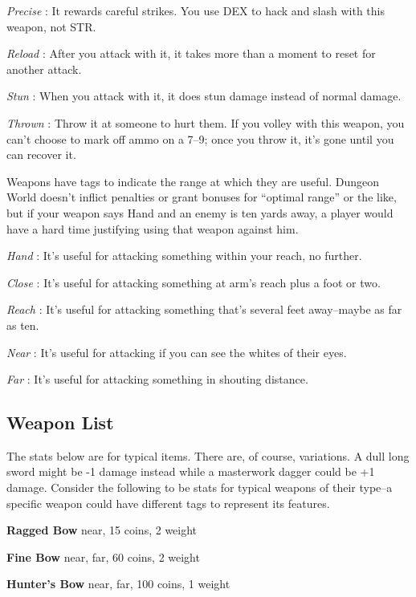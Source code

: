 \emph{Precise}
: It rewards careful strikes. You use DEX to hack and slash with this weapon, not STR.

\emph{Reload}
: After you attack with it, it takes more than a moment to reset for another attack. 

\emph{Stun}
: When you attack with it, it does stun damage instead of normal damage. 

\emph{Thrown}
: Throw it at someone to hurt them. If you volley with this weapon, you can't choose to mark off ammo on a 7--9; once you throw it, it's gone until you can recover it. 

Weapons have tags to indicate the range at which they are useful. Dungeon World doesn't inflict penalties or grant bonuses for ``optimal range'' or the like, but if your weapon says Hand and an enemy is ten yards away, a player would have a hard time justifying using that weapon against him.

\emph{Hand}
: It's useful for attacking something within your reach, no further.

\emph{Close}
: It's useful for attacking something at arm's reach plus a foot or two.

\emph{Reach}
: It's useful for attacking something that's several feet away--maybe as far as ten. 

\emph{Near}
: It's useful for attacking if you can see the whites of their eyes. 

\emph{Far}
: It's useful for attacking something in shouting distance.
\subsection{Weapon List}

The stats below are for typical items. There are, of course, variations. A dull long sword might be -1 damage instead while a masterwork dagger could be +1 damage. Consider the following to be stats for typical weapons of their type--a specific weapon could have different tags to represent its features.

{\noindent \bfseries Ragged Bow} \hspace*{\fill} near, 15 coins, 2 weight

{\noindent \bfseries Fine Bow} \hspace*{\fill} near, far, 60 coins, 2 weight

{\noindent \bfseries Hunter's Bow} \hspace*{\fill} near, far, 100 coins, 1 weight

